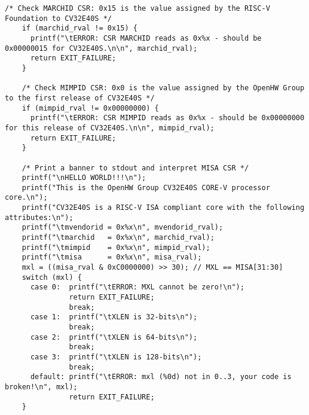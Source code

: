 \begin{lstlisting}[caption={Sanity test for the CV32E40S core.}, label=lst:sample_code]
    /* Check MARCHID CSR: 0x15 is the value assigned by the RISC-V Foundation to CV32E40S */
    if (marchid_rval != 0x15) {
      printf("\tERROR: CSR MARCHID reads as 0x%x - should be 0x00000015 for CV32E40S.\n\n", marchid_rval);
      return EXIT_FAILURE;
    }

    /* Check MIMPID CSR: 0x0 is the value assigned by the OpenHW Group to the first release of CV32E40S */
    if (mimpid_rval != 0x00000000) {
      printf("\tERROR: CSR MIMPID reads as 0x%x - should be 0x00000000 for this release of CV32E40S.\n\n", mimpid_rval);
      return EXIT_FAILURE;
    }

    /* Print a banner to stdout and interpret MISA CSR */
    printf("\nHELLO WORLD!!!\n");
    printf("This is the OpenHW Group CV32E40S CORE-V processor core.\n");
    printf("CV32E40S is a RISC-V ISA compliant core with the following attributes:\n");
    printf("\tmvendorid = 0x%x\n", mvendorid_rval);
    printf("\tmarchid   = 0x%x\n", marchid_rval);
    printf("\tmimpid    = 0x%x\n", mimpid_rval);
    printf("\tmisa      = 0x%x\n", misa_rval);
    mxl = ((misa_rval & 0xC0000000) >> 30); // MXL == MISA[31:30]
    switch (mxl) {
      case 0:  printf("\tERROR: MXL cannot be zero!\n");
               return EXIT_FAILURE;
               break;
      case 1:  printf("\tXLEN is 32-bits\n");
               break;
      case 2:  printf("\tXLEN is 64-bits\n");
               break;
      case 3:  printf("\tXLEN is 128-bits\n");
               break;
      default: printf("\tERROR: mxl (%0d) not in 0..3, your code is broken!\n", mxl);
               return EXIT_FAILURE;
    }


\end{lstlisting}

